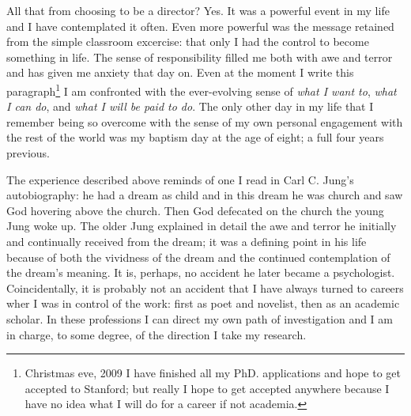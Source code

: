 All that from choosing to be a director? Yes. It was a powerful event in my life and I have contemplated it often. Even more powerful was the message retained from the simple classroom excercise: that only I had the control to become something in life. The sense of responsibility filled me both with awe and terror and has given me anxiety that day on. Even at the moment I write this paragraph\footnote{Christmas eve, 2009 I have finished all my PhD. applications and hope to get accepted to Stanford; but really I hope to get accepted anywhere because I have no idea what I will do for a career if not academia.} I am confronted with the ever-evolving sense of \textsl{what I want to}, \textsl{what I can do}, and \textsl{what I will be paid to do}. The only other day in my life that I remember being so overcome with the sense of my own personal engagement with the rest of the world was my baptism day at the age of eight; a full four years previous.

The experience described above reminds of one I read in Carl C. Jung's autobiography: he had a dream as child and in this dream he was church and saw God hovering above the church. Then God defecated on the church the young Jung woke up. The older Jung explained in detail the awe and terror he initially and continually received from the dream; it was a defining point in his life because of both the vividness of the dream and the continued contemplation of the dream's meaning. It is, perhaps, no accident he later became a psychologist. Coincidentally, it is probably not an accident that I have always turned to careers wher I was in control of the work: first as poet and novelist, then as an academic scholar. In these professions I can direct my own path of investigation and I am in charge, to some degree, of the direction I take my research.


   